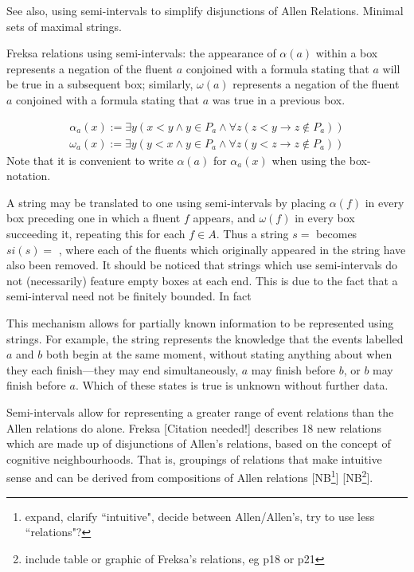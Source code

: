 \documentclass[a4paper,12pt,leqno]{article}
\newcommand{\vph}[1]{\vphantom{#1}}
\newcommand{\ebox}[1]{\fbox{$\vph{'(),}#1$}}
\newcommand{\EventString}[1]{
	\renewcommand*{\do}[1]{\ebox{##1}}%
	\PipeParser{#1}
}
\newcommand{\citeneeded}[1][]{{\color{red}[Citation needed!#1]}}
\newcommand{\selfnote}[1]{{\color{red}[NB\footnote{{\color{red}#1}}]}}
\newcommand{\nb}{\selfnote}
\begin{document}
See also, using semi-intervals to simplify disjunctions of Allen Relations. Minimal sets of maximal strings.

Freksa relations using semi-intervals: the appearance of $\alpha(a)$ within a box represents a negation of the fluent $a$ conjoined with a formula stating that $a$ will be true in a subsequent box; similarly, $\omega(a)$ represents a negation of the fluent $a$ conjoined with a formula stating that $a$ was true in a previous box.

\begin{align}
\alpha_a(x) := \exists y(x < y \land y \in P_a \land \forall z(z < y \rightarrow z \notin P_a))\\
\omega_a(x) := \exists y(y < x \land y \in P_a \land \forall z(y < z \rightarrow z \notin P_a))
\end{align}
Note that it is convenient to write $\alpha(a)$ for $\alpha_a(x)$ when using the box-notation.

A string may be translated to one using semi-intervals by placing $\alpha(f)$ in every box preceding one in which a fluent $f$ appears, and $\omega(f)$ in every box succeeding it, repeating this for each $f \in A$. Thus a string $s = $\EventString{{}|a|b|{}} becomes $si(s) = $\EventString{\alpha(a),\alpha(b)|\alpha(b)|\omega(a)|\omega(a),\omega(b)}, where each of the fluents which originally appeared in the string have also been removed. It should be noticed that strings which use semi-intervals do not (necessarily) feature empty boxes at each end. This is due to the fact that a semi-interval need not be finitely bounded. In fact

This mechanism allows for partially known information to be represented using strings. For example, the string \EventString{\alpha(a), \alpha(b)|{}} represents the knowledge that the events labelled $a$ and $b$ both begin at the same moment, without stating anything about when they each finish---they may end simultaneously, $a$ may finish before $b$, or $b$ may finish before $a$. Which of these states is true is unknown without further data.

Semi-intervals allow for representing a greater range of event relations than the Allen relations do alone. Freksa \citeneeded{} describes 18 new relations which are made up of disjunctions of Allen's relations, based on the concept of cognitive neighbourhoods. That is, groupings of relations that make intuitive sense and can be derived from compositions of Allen relations \nb{expand, clarify ``intuitive", decide between Allen/Allen's, try to use less ``relations"?} \nb{include table or graphic of Freksa's relations, eg p18 or p21}.
\end{document}
